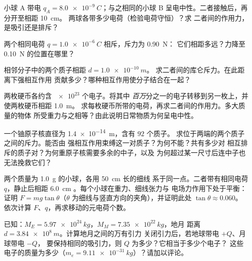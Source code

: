 \begin{exercise}[$\star\star$]\label{exo:g11:fundamental-interactions:8}
小球 A 带电 $q_A = \qty{+8.0e-9}{C}$；与之相同的小球 B
呈电中性。二者接触后，再分开至相距 \qty{10}{cm}。
两球各带多少电荷（检验电荷守恒）？求
二者间的作用力，是吸引还是排斥？
\end{exercise}

\begin{exercise}[$\star\star$]\label{exo:g11:fundamental-interactions:9}
两个相同电荷 $q = \qty{1.0e-6}{C}$ 相斥，斥力为 \qty{0.90}{N}：
它们相距多远？力降至 \qty{0.10}{N} 的位置在哪里？
\end{exercise}

\begin{exercise}[$\star\star$]\label{exo:g11:fundamental-interactions:10}
相邻分子中的两个质子相距 $d = \qty{1.0e-10}{m}$。
求二者间的库仑斥力。在此距离下强相互作用
贡献多少？哪种相互作用使分子结合在一起？
\end{exercise}

\begin{exercise}[$\star\star$]\label{exo:g11:fundamental-interactions:11}
两枚硬币各约含 $\num{e23}$ 个电子。将其中
\emph{百万}分之一的电子转移到另一枚上，并使两枚硬币相距 \qty{1.0}{m}。
求每枚硬币所带的电荷，再求二者间的作用力。多大质量的物体
所受重力与之相等？由此说明日常物质为何呈电中性。
\end{exercise}

\begin{exercise}[$\star\star\star$]\label{exo:g11:fundamental-interactions:12}
一个铀原子核直径为 \qty{1.4e-14}{m}，含有 $92$ 个质子。
求位于两端的两个质子之间的斥力。能否由
强相互作用束缚这一对质子？为何不能？共有多少对
相互排斥的质子对？为何重原子核需要多余的中子，以及
为何超过某一尺寸后连中子也无法挽救它们？
\end{exercise}

\begin{exercise}[$\star\star\star$]\label{exo:g11:fundamental-interactions:13}
两个质量为 \qty{1.0}{g} 的小球，各用 \qty{50}{cm} 长的细线
系于同一点。二者带有相同电荷 $q$，静止后相距 \qty{6.0}{cm}
。每个小球在重力、细线张力与
电场力作用下处于平衡：证明 $F = mg\tan\theta$（$\theta$
为细线与竖直方向的夹角），并证明此处 $\tan\theta \approx 0.060$。
依次计算 $F$、$q$，再求移动的元电荷个数。
\end{exercise}

\begin{exercise}[$\star\star\star$]\label{exo:g11:fundamental-interactions:14}
已知：$M_E = \qty{5.97e24}{kg}$，$M_M = \qty{7.35e22}{kg}$，地月
距离 $d = \qty{3.84e8}{m}$。计算地月之间的万有引力
关闭引力后，若地球带电 $+Q$、月球带电 $-Q$，
要保持相同的吸引力，则 $Q$ 为多少？它相当于多少个电子？
这些电子的质量为多少（$m_e = \qty{9.11e-31}{kg}$）？请加以评论。
\end{exercise}

